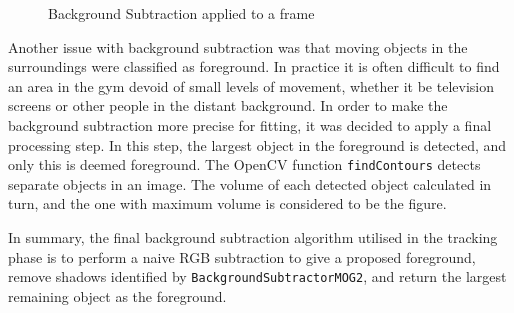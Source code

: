 \begin{figure}[H]
    \centering
\caption{Background Subtraction applied to a frame}
\label{fig:bgsub}
\end{figure}

Another issue with background subtraction was that moving objects in the surroundings were classified as foreground. In practice it is often difficult to find an area in the gym devoid of small levels of movement, whether it be television screens or other people in the distant background. In order to make the background subtraction more precise for fitting, it was decided to apply a final processing step. In this step, the largest object in the foreground is detected, and only this is deemed foreground. The OpenCV function \texttt{findContours} detects separate objects in an image. The volume of each detected object calculated in turn, and the one with maximum volume is considered to be the figure.

In summary, the final background subtraction algorithm utilised in the tracking phase is to perform a naive RGB subtraction to give a proposed foreground, remove shadows identified by \texttt{BackgroundSubtractorMOG2}, and return the largest remaining object as the foreground.